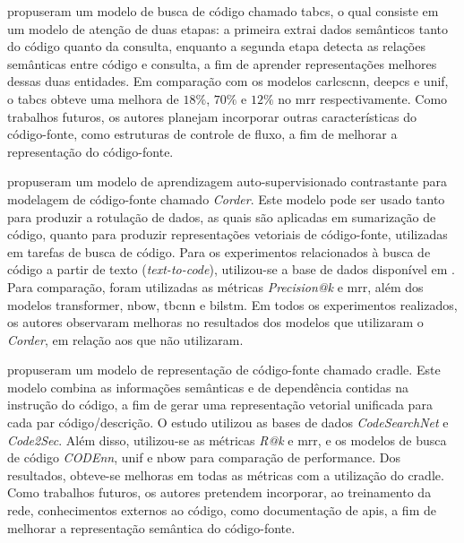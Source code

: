 \textcite{Xu2021TwoStageAM} propuseram um modelo de busca de código chamado \gls{tabcs}, o qual consiste em um modelo de atenção de duas etapas: a primeira extrai dados semânticos tanto do código quanto da consulta, enquanto a segunda etapa detecta as relações semânticas entre código e consulta, a fim de aprender representações melhores dessas duas entidades. Em comparação com os modelos \gls{carlcscnn}, \gls{deepcs} e \gls{unif}, o \gls{tabcs} obteve uma melhora de $18\%$, $70\%$ e $12\%$ no \gls{mrr} respectivamente. Como trabalhos futuros, os autores planejam incorporar outras características do código-fonte, como estruturas de controle de fluxo, a fim de melhorar a representação do código-fonte.

\textcite{Bui2021SelfSupervisedCL} propuseram um modelo de aprendizagem auto-supervisionado contrastante para modelagem de código-fonte chamado \textit{Corder}. Este modelo pode ser usado tanto para produzir a rotulação de dados, as quais são aplicadas em sumarização de código, quanto para produzir representações  vetoriais de código-fonte, utilizadas em tarefas de busca de código. Para os experimentos relacionados à busca de código a partir de texto (\textit{text-to-code}), utilizou-se a base de dados disponível em \cite{Gu2018DeepCS}. Para comparação, foram utilizadas as métricas \textit{Precision@k} e \gls{mrr}, além dos modelos transformer, \gls{nbow}, \gls{tbcnn} e \gls{bilstm}. Em todos os experimentos realizados, os autores observaram melhoras no resultados dos modelos que utilizaram o \textit{Corder}, em relação aos que não utilizaram.

\textcite{Gu2021CRaDLeDC} propuseram um modelo de representação de código-fonte chamado \gls{cradle}. Este modelo combina as informações semânticas e de dependência contidas na instrução do código, a fim de gerar uma representação vetorial unificada para cada par código/descrição. O estudo utilizou as bases de dados \textit{CodeSearchNet} \cite{Husain2019CodeSearchNetCE} e \textit{Code2Sec}. Além disso, utilizou-se as métricas \textit{R@k} e \gls{mrr}, e os modelos de busca de código \textit{CODEnn}, \gls{unif} e \gls{nbow} para comparação de performance. Dos resultados, obteve-se melhoras em todas as métricas com a utilização do \gls{cradle}. Como trabalhos futuros, os autores pretendem incorporar, ao treinamento da rede, conhecimentos externos ao código, como documentação de \glspl{api}, a fim de melhorar a representação semântica do código-fonte.

